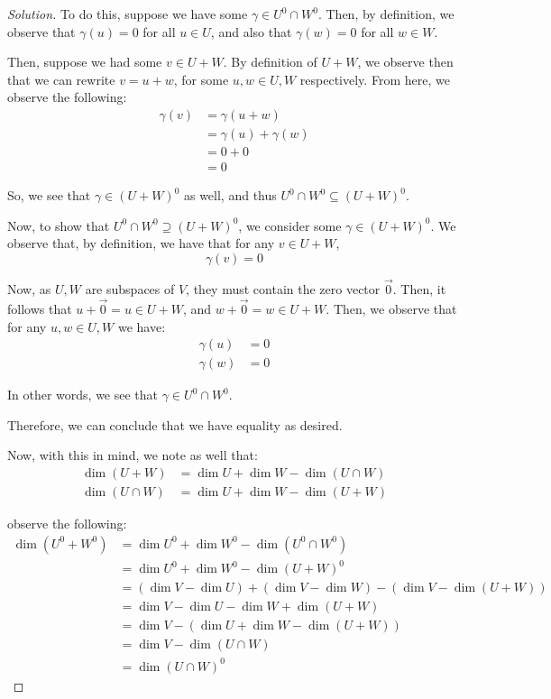 \documentclass{article}
\newenvironment{solution}{\begin{proof}[Solution]}{\end{proof}}
\renewcommand\qedsymbol{$\blacksquare$}
\newenvironment{innerproof}{\renewcommand{\qedsymbol}{$\square$}\proof}{\endproof}
\begin{document}
\begin{solution}
\begin{innerproof}
			To do this, suppose we have some $\gamma \in U^{0} \cap W^{0}$. Then, by definition, we observe that $\gamma(u) = 0$ for all $u \in U$, and also that $\gamma(w) = 0$ for all $w \in W$.
			
			Then, suppose we had some $v \in U + W$. By definition of $U + W$, we observe then that we can rewrite $v = u + w$, for some $u, w \in U, W$ respectively. From here, we observe the following:
			\begin{align*}
				\gamma(v) &= \gamma(u + w) \\
				&= \gamma(u) + \gamma(w) \\
				&= 0 + 0 \\
				&= 0
			\end{align*}
		
			So, we see that $\gamma \in (U + W)^{0}$ as well, and thus $U^{0} \cap W^{0} \subseteq (U + W)^{0}$.
			
			Now, to show that $U^{0} \cap W^{0} \supseteq (U+W)^{0}$, we consider some $\gamma \in (U+W)^{0}$. We observe that, by definition, we have that for any $v \in U + W$,
			\begin{equation*}
				\gamma(v) = 0
			\end{equation*}
		
			Now, as $U,W$ are subspaces of $V$, they must contain the zero vector $\vec{0}$. Then, it follows that $u + \vec{0} = u \in U +W$, and $w + \vec{0} = w \in U + W$. Then, we observe that for any $u, w \in U, W$ we have:
			\begin{align*}
				\gamma(u) &= 0 \\
				\gamma(w) &= 0
			\end{align*}
		
			In other words, we see that $\gamma \in U^{0} \cap W^{0}$.
			
			Therefore, we can conclude that we have equality as desired.
		\end{innerproof}
	
		Now, with this in mind, we note as well that:
		\begin{align*}
			\dim (U + W) &= \dim U + \dim W - \dim (U \cap W) \\
			\dim (U \cap W) &= \dim U + \dim W - \dim (U + W)
		\end{align*}
		
		observe the following:
		\begin{align*}
			\dim (U^{0} + W^{0}) &= \dim U^{0} + \dim W^{0} - \dim (U^{0} \cap W^{0}) \\
			&= \dim U^{0} + \dim W^{0} - \dim (U+W)^{0} \\
			&= (\dim V - \dim U) + (\dim V - \dim W) - (\dim V - \dim (U + W)) \\
			&= \dim V - \dim U - \dim W + \dim (U + W) \\
			&= \dim V - (\dim U + \dim W - \dim (U + W)) \\
			&= \dim V - \dim (U \cap W) \\
			&= \dim (U \cap W)^{0}
		\end{align*}
	

\end{solution}
\end{document}
